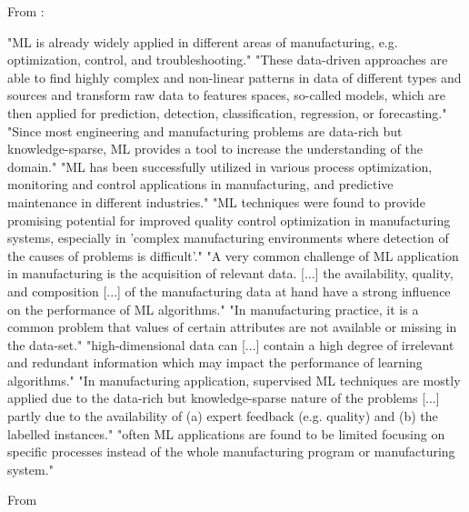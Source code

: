 From \parencite{wuest2016ml_manufacturing} :

"ML is already widely applied in different areas of manufacturing, e.g. optimization, control, and troubleshooting."
"These data-driven approaches are able to find highly complex and non-linear patterns in data of different types and sources and transform raw data to features spaces, so-called models, which are then applied for prediction, detection, classification, regression, or forecasting."
"Since most engineering and manufacturing problems are data-rich but knowledge-sparse, ML provides a tool to increase the understanding of the domain."
"ML has been successfully utilized in various process optimization, monitoring and control applications in manufacturing, and predictive maintenance in different industries."
"ML techniques were found to provide promising potential for improved quality control optimization in manufacturing systems, especially in 'complex manufacturing environments where detection of the causes of problems is difficult'."
"A very common challenge of ML application in manufacturing is the acquisition of relevant data. [...] the availability, quality, and composition [...] of the manufacturing data at hand have a strong influence on the performance of ML algorithms."
"In manufacturing practice, it is a common problem that values of certain attributes are not available or missing in the data-set."
"high-dimensional data can [...] contain a high degree of irrelevant and redundant information which may impact the performance of learning algorithms."
"In manufacturing application, supervised ML techniques are mostly applied due to the data-rich but knowledge-sparse nature of the problems [...] partly due to the availability of (a) expert feedback (e.g. quality) and (b) the labelled instances."
"often ML applications are found to be limited focusing on specific processes instead of the whole manufacturing program or manufacturing system."

From \parencite{weichert2019review_ml_optimization_production}

